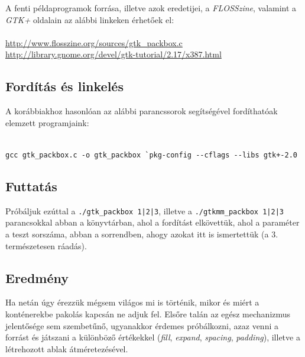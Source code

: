 \documentclass[a4paper,10pt]{article}
\begin{document}
A fenti példaprogramok forrása, illetve azok eredetijei, a \textit{FLOSSzine}, valamint a \textit{GTK+} oldalain az alábbi linkeken érhetőek el:
\ \\\\
\url{http://www.flosszine.org/sources/gtk_packbox.c}\\
\url{http://library.gnome.org/devel/gtk-tutorial/2.17/x387.html}

\subsection{Fordítás és linkelés}

A korábbiakhoz hasonlóan az alábbi parancssorok segítségével fordíthatóak elemzett programjaink:

\small
\ \\
\texttt{gcc gtk\_packbox.c -o gtk\_packbox \`{}pkg-config {-}-cflags {-}-libs gtk+-2.0}
\normalsize

\subsection{Futtatás}

Próbáljuk ezúttal a \texttt{./gtk\_packbox 1|2|3}, illetve a \texttt{./gtkmm\_packbox 1|2|3} parancsokkal abban a könyvtárban, ahol a fordítást elkövettük, ahol a paraméter a teszt sorszáma, abban a sorrendben, ahogy azokat itt is ismertettük (a 3. természetesen ráadás).

\subsection{Eredmény}

Ha netán úgy érezzük mégsem világos mi is történik, mikor és miért a konténerekbe pakolás kapcsán ne adjuk fel. Elsőre talán az egész mechanizmus jelentősége sem szembetűnő, ugyanakkor érdemes próbálkozni, azaz venni a forrást és játszani a különböző értékekkel (\textit{fill}, \textit{expand}, \textit{spacing}, \textit{padding}), illetve a létrehozott ablak átméretezésével.

\nocite{gtktut}
\nocite{gtkmmtut}
\nocite{ggad}
\nocite{gtktutmagy}



\end{document}
